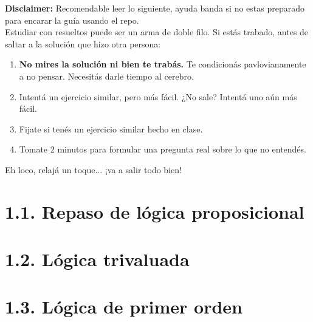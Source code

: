 \begin{disclaimerbox}
\textbf{Disclaimer:} Recomendable leer lo siguiente, ayuda banda si no estas preparado para encarar la guía usando el repo. \\

Estudiar con resueltos puede ser un arma de doble filo. Si estás trabado, antes de saltar a la solución que hizo otra persona:
\begin{enumerate}
    \item \textbf{No mires la solución ni bien te trabás.} Te condicionás pavlovianamente a no pensar. Necesitás darle tiempo al cerebro.
    \item Intentá un ejercicio similar, pero más fácil. ¿No sale? Intentá uno aún más fácil.
    \item Fijate si tenés un ejercicio similar hecho en clase.
    \item Tomate 2 minutos para formular una pregunta real sobre lo que no entendés.
\end{enumerate}
Eh loco, relajá un toque... ¡va a salir todo bien!
\end{disclaimerbox}

\newpage

\section*{1.1. Repaso de lógica proposicional}







\section*{1.2. Lógica trivaluada}




\section*{1.3. Lógica de primer orden}



\vspace{1cm}





